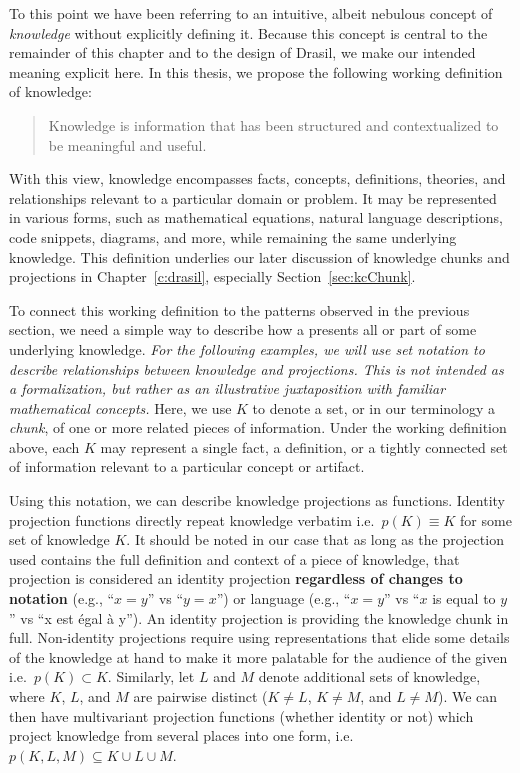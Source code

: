 To this point we have been referring to an intuitive, albeit nebulous concept 
of \emph{knowledge} without explicitly defining it. Because this concept is 
central to the remainder of this chapter and to the design of Drasil, we make 
our intended meaning explicit here. In this thesis, we propose the following 
working definition of knowledge: 
\begin{quote} Knowledge is information that has been 
structured and contextualized to be meaningful and useful.\end{quote}
With this view, knowledge encompasses facts, concepts, definitions, theories, 
and relationships relevant to a particular domain or problem. It may be 
represented in various forms, such as mathematical equations, natural 
language descriptions, code snippets, diagrams, and more, while remaining the 
same underlying knowledge. This definition underlies our later discussion of 
knowledge chunks and projections in Chapter~\ref{c:drasil}, especially 
Section~\ref{sec:kcChunk}.

To connect this working definition to the patterns observed in the previous 
section, we need a simple way to describe how a \sf{} presents all or part of 
some underlying knowledge. \emph{For the following examples, we will use set 
notation to describe relationships between knowledge and projections. This is 
not intended as a formalization, but rather as an illustrative juxtaposition 
with familiar mathematical concepts.} Here, we use $K$ to denote a 
set, or in our terminology a \emph{chunk}, of one or more related pieces of 
information. Under the working definition above, each $K$ may represent a 
single fact, a definition, or a tightly connected set of information relevant 
to a particular concept or artifact.

Using this notation, we can describe knowledge projections as functions. Identity 
projection functions directly repeat knowledge verbatim i.e.\ $p(K) \equiv K$ 
for some set of knowledge $K$. It should be noted in our case that as long as 
the projection used contains the full definition and context of a piece of 
knowledge, that projection is considered an identity projection 
\textbf{regardless of changes to notation} (e.g., ``$x = y$'' vs ``$y = x$'') or
language (e.g., ``$x = y$'' vs ``$x$ is equal to $y$'' vs ``x est \'egal \`a y'').
An identity projection is providing the knowledge chunk in full. 
Non-identity projections require using representations that elide some details 
of the knowledge at hand to make it more palatable for the audience of the 
given \sf{} i.e.\ $p(K) \subset K$. Similarly, let $L$ and $M$ denote
additional sets of knowledge, where $K$, $L$, and $M$ are pairwise distinct
($K \neq L$, $K \neq M$, and $L \neq M$). We can then have multivariant
projection functions (whether identity or not) which project knowledge from
several places into one form, i.e.\
$p(K,L,M) \subseteq K\cup L\cup M$.

